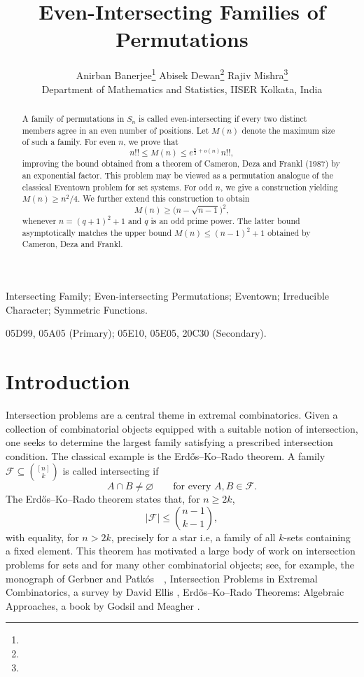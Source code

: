 \documentclass[12pt]{article}
\title{Even-Intersecting Families of Permutations}
\author{
    Anirban Banerjee\thanks{\text{anirban.banerjee@iiserkol.ac.in}} \qquad
    Abisek Dewan\thanks{\text{ad22rs069@iiserkol.ac.in}} \qquad
    Rajiv Mishra\thanks{\text{rm20rs017@iiserkol.ac.in}} \\[0.8em]
    \small Department of Mathematics and Statistics, IISER Kolkata, India
}
\date{ }
\theoremstyle{definition}
\newcommand{\1}{\mathbf 1}
\begin{document}
\maketitle

\begin{abstract}
    A family of permutations in $S_n$ is called even-intersecting if every two distinct members agree in an even number of positions. Let $M(n)$ denote the maximum size of such a family. For even $n$, we prove that
    $$n!!\leq M(n)\leq e^{\frac{n}{2}+o(n)}n!!,$$
    improving the bound obtained from a theorem of Cameron, Deza and Frankl (1987) by an exponential factor. 
    This problem may be viewed as a permutation analogue of the classical Eventown problem for set systems. For odd $n$, we give a construction yielding $M(n)\geq n^2/4$. We further extend this construction to obtain
    $$ M(n)\geq\bigl(n-\sqrt{n-1}\bigr)^2 ,$$
   whenever $n=(q+1)^2+1$ and $q$ is an odd prime power. The latter bound asymptotically matches the upper bound $M(n)\leq(n-1)^2+1$ obtained by  Cameron, Deza and Frankl.
\end{abstract}

 Intersecting Family; Even-intersecting Permutations; Eventown; Irreducible  Character; Symmetric Functions.

 05D99, 05A05 (Primary); 05E10,  05E05, 20C30 (Secondary).

\section{Introduction}




 Intersection problems are a central theme in extremal combinatorics. Given a collection of combinatorial objects equipped with a suitable notion of intersection, one seeks to determine the largest family satisfying a prescribed intersection condition. The classical example is the Erd\H{o}s--Ko--Rado theorem. A family $\mathcal{F}\subseteq\binom{[n]}{k}$ is called intersecting if
\[
A\cap B\neq\varnothing
\qquad\text{for every } A,B\in\mathcal{F}.
\]
The Erd\H{o}s--Ko--Rado theorem \cite{erdos1961intersection} states that, for $n\geq 2k$,
\[
|\mathcal{F}|\leq \binom{n-1}{k-1},
\]
with equality, for $n>2k$, precisely for a star  i.e, a family of all $k$-sets containing a fixed element. This theorem has motivated a large body of work on intersection problems for sets and for many other combinatorial objects; see, for example, the monograph of Gerbner and Patk\'os~\ \cite{gerbner2018extremal}, Intersection Problems in Extremal Combinatorics, a survey by David Ellis \cite{ellis2022intersection}, Erdõs–Ko–Rado Theorems: Algebraic Approaches, a book by Godsil and Meagher \cite{godsil1945erdos}.
\end{document}
